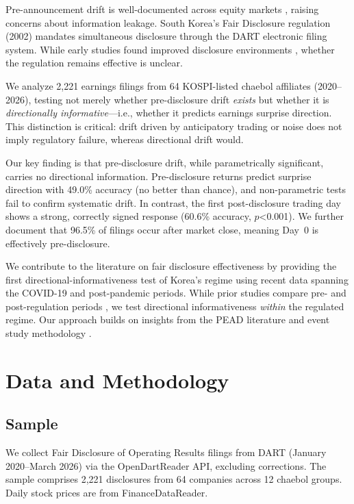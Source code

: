 \documentclass[manuscript,review,anonymous]{acmart}
\begin{document}
Pre-announcement drift is well-documented across equity markets \cite{kaniel2012individual}, raising concerns about information leakage. South Korea's Fair Disclosure regulation (2002) mandates simultaneous disclosure through the DART electronic filing system. While early studies found improved disclosure environments \cite{yun2012fair, park2020disclosure}, whether the regulation remains effective is unclear.

We analyze 2,221 earnings filings from 64 KOSPI-listed chaebol affiliates (2020--2026), testing not merely whether pre-disclosure drift \textit{exists} but whether it is \textit{directionally informative}---i.e., whether it predicts earnings surprise direction. This distinction is critical: drift driven by anticipatory trading or noise does not imply regulatory failure, whereas directional drift would.

Our key finding is that pre-disclosure drift, while parametrically significant, carries no directional information. Pre-disclosure returns predict surprise direction with 49.0\% accuracy (no better than chance), and non-parametric tests fail to confirm systematic drift. In contrast, the first post-disclosure trading day shows a strong, correctly signed response (60.6\% accuracy, $p$<0.001). We further document that 96.5\% of filings occur after market close, meaning Day~0 is effectively pre-disclosure.

We contribute to the literature on fair disclosure effectiveness \cite{heflin2003regulation, bailey2003regulation, eleswarapu2004impact, gomes2007sec} by providing the first directional-informativeness test of Korea's regime using recent data spanning the COVID-19 and post-pandemic periods. While prior studies compare pre- and post-regulation periods \cite{ahmed2003impact, yoon2011impact}, we test directional informativeness \textit{within} the regulated regime. Our approach builds on insights from the PEAD literature \cite{bernard1989post} and event study methodology \cite{brown1985using}.

\section{Data and Methodology}

\subsection{Sample}

We collect Fair Disclosure of Operating Results filings from DART (January 2020--March 2026) via the OpenDartReader API, excluding corrections. The sample comprises 2,221 disclosures from 64 companies across 12 chaebol groups. Daily stock prices are from FinanceDataReader.
\end{document}
